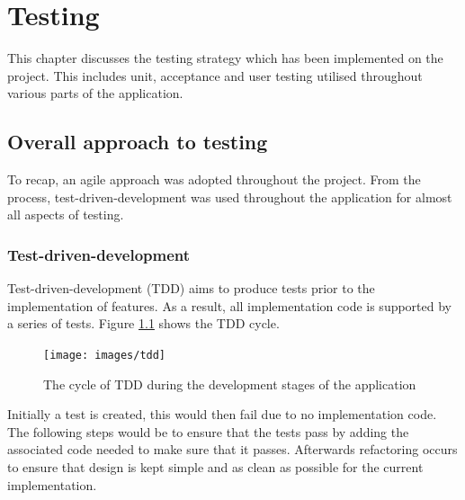 \chapter{Testing}




This chapter discusses the testing strategy which has been implemented on the project. This includes unit, acceptance and user testing utilised throughout various parts of the application.

\section{Overall approach to testing}
To recap, an agile approach was adopted throughout the project. From the process, test-driven-development was used throughout the application for almost all aspects of testing.

\subsection{Test-driven-development}
Test-driven-development (TDD) aims to produce tests prior to the implementation of features. As a result, all implementation code is supported by a series of tests. Figure \ref{fig:tdd} shows the TDD cycle.

\begin{figure}
  \texttt{[image: images/tdd]}
  \centering
  \caption{The cycle of TDD during the development stages of the application}
  \label{fig:tdd}
\end{figure}

Initially a test is created, this would then fail due to no implementation code. The following steps would be to ensure that the tests pass by adding the associated code needed to make sure that it passes. Afterwards refactoring occurs to ensure that design is kept simple and as clean as possible for the current implementation.

